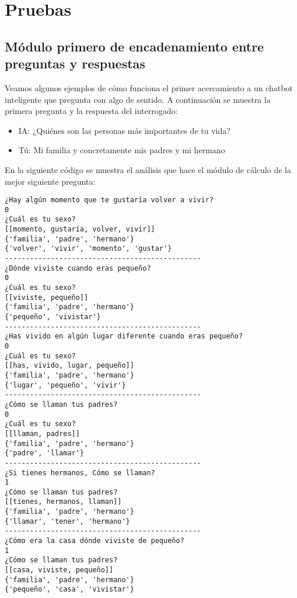 \chapter{Pruebas}
\label{cap:pruebas}

\section{Módulo primero de encadenamiento entre preguntas y respuestas}
Veamos algunos ejemplos de cómo funciona el primer acercamiento a un chatbot inteligente que pregunta con algo de sentido. A continuación se muestra la primera pregunta y la respuesta del interrogado:
\begin{itemize}
	\item[] IA: ¿Quiénes son las personas más importantes de tu vida?
	\item[] Tú: Mi familia y concretamente mis padres y mi hermano
\end{itemize}

En la siguiente código se muestra el análisis que hace el módulo de cálculo de la mejor siguiente pregunta:

\begin{verbatim}
¿Hay algún momento que te gustaría volver a vivir?
0
¿Cuál es tu sexo?
[[momento, gustaría, volver, vivir]]
{'familia', 'padre', 'hermano'}
{'volver', 'vivir', 'momento', 'gustar'}
-----------------------------------------------
¿Dónde viviste cuando eras pequeño?
0
¿Cuál es tu sexo?
[[viviste, pequeño]]
{'familia', 'padre', 'hermano'}
{'pequeño', 'vivistar'}
-----------------------------------------------
¿Has vivido en algún lugar diferente cuando eras pequeño?
0
¿Cuál es tu sexo?
[[has, vivido, lugar, pequeño]]
{'familia', 'padre', 'hermano'}
{'lugar', 'pequeño', 'vivir'}
-----------------------------------------------
¿Cómo se llaman tus padres?
0
¿Cuál es tu sexo?
[[llaman, padres]]
{'familia', 'padre', 'hermano'}
{'padre', 'llamar'}
-----------------------------------------------
¿Si tienes hermanos, Cómo se llaman?
1
¿Cómo se llaman tus padres?
[[tienes, hermanos, llaman]]
{'familia', 'padre', 'hermano'}
{'llamar', 'tener', 'hermano'}
-----------------------------------------------
¿Cómo era la casa dónde viviste de pequeño?
1
¿Cómo se llaman tus padres?
[[casa, viviste, pequeño]]
{'familia', 'padre', 'hermano'}
{'pequeño', 'casa', 'vivistar'}
\end{verbatim}



